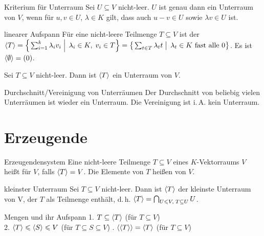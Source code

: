 \begin{Satz}{Kriterium für Unterraum}
    Sei $U \subseteq V$ nicht-leer.
    $U$ ist genau dann ein Unterraum von $V$, wenn für
    $u, v \in U$, $\lambda \in K$ gilt,
    dass auch $u - v \in U$ sowie $\lambda v \in U$ ist.
\end{Satz}

\begin{Def}{linearer Aufspann}
    Für eine nicht-leere Teilmenge $T \subseteq V$ ist der
     \\
    $\langle T \rangle = \left\{\left. \sum_{i=1}^k \lambda_i v_i \;\right|\;
    \lambda_i \in K,\; v_i \in T \right\} =
    \left\{\left. \sum_{t \in T} \lambda_t t \;\right|\;
    \lambda_t \in K \text{ fast alle } 0\right\}$.
    Es ist $\langle \emptyset \rangle = (0)$.
\end{Def}

\begin{Kor}
    Sei $T \subseteq V$ nicht-leer.
    Dann ist $\langle T \rangle$ ein Unterraum von $V$.
\end{Kor}

\begin{Lemma}{Durchschnitt/Vereinigung von Unterräumen}
    Der Durchschnitt von beliebig vielen Unterräumen ist wieder ein Unterraum.
    Die Vereinigung ist i.\,A. kein Unterraum.
\end{Lemma}

\section{%
    Erzeugende%
}

\begin{Def}{Erzeugendensystem}
    Eine nicht-leere Teilmenge $T \subseteq V$ eines $K$-Vektorraums $V$ heißt
     für $V$, falls $\langle T \rangle = V$.
    Die Elemente von $T$ heißen  von $V$.
\end{Def}

\begin{Satz}{kleinster Unterraum}
    Sei $T \subseteq V$ nicht-leer.
    Dann ist $\langle T \rangle$ der kleinste Unterraum von V, der $T$ als
    Teilmenge enthält, d.\,h.
    $\langle T \rangle = \bigcap_{U \leqslant V,\; T \subseteq U} U$.
\end{Satz}

\begin{Lemma}{Mengen und ihr Aufspann}
    1. $T \subseteq \langle T \rangle$ \quad (für $T \subseteq V$) \\
    2. $\langle T \rangle \leqslant \langle S \rangle \leqslant V$ \quad
    (für $T \subseteq S \subseteq V$) . $\langle \langle T \rangle \rangle = \langle T \rangle$ \quad (für $T \subseteq V$)
\end{Lemma}

